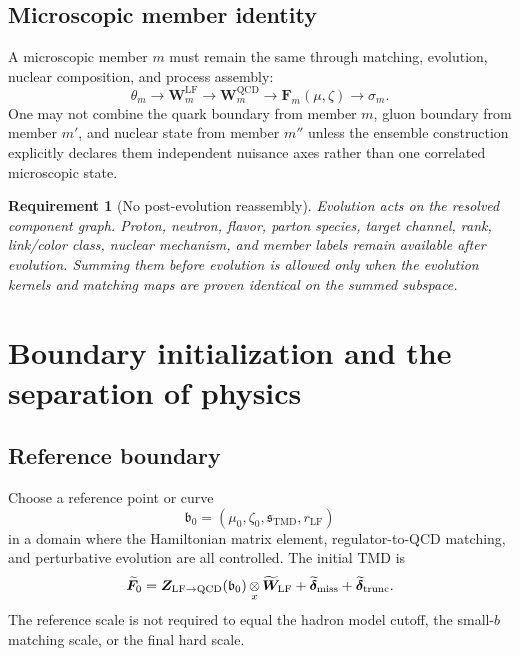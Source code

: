 \documentclass[11pt]{article}
\newtheorem{requirement}[definition]{Requirement}
\newcommand{\LF}{\mathrm{LF}}
\newcommand{\TMD}{\mathrm{TMD}}
\newcommand{\QCD}{\mathrm{QCD}}
\newcommand{\otimesx}{\mathop{\otimes}_{x}}
\begin{document}
\subsection{Microscopic member identity}

A microscopic member \(m\) must remain the same through matching, evolution,
nuclear composition, and process assembly:
\begin{equation}
 \theta_m
 \longrightarrow
 \bm W_m^{\LF}
 \longrightarrow
 \bm W_m^{\QCD}
 \longrightarrow
 \bm F_m(\mu,\zeta)
 \longrightarrow
 \sigma_m.
 \label{eq:member-identity-chain}
\end{equation}
One may not combine the quark boundary from member \(m\), gluon boundary from
member \(m'\), and nuclear state from member \(m''\) unless the ensemble
construction explicitly declares them independent nuisance axes rather than
one correlated microscopic state.

\begin{requirement}[No post-evolution reassembly]
Evolution acts on the resolved component graph.  Proton, neutron, flavor,
parton species, target channel, rank, link/color class, nuclear mechanism,
and member labels remain available after evolution.  Summing them before
evolution is allowed only when the evolution kernels and matching maps are
proven identical on the summed subspace.
\end{requirement}

\section{Boundary initialization and the separation of physics}
\label{sec:boundary}

\subsection{Reference boundary}

Choose a reference point or curve
\begin{equation}
 \mathfrak b_0=
 \left(\mu_0,\zeta_0,\mathfrak s_{\TMD},r_{\LF}\right)
 \label{eq:boundary-record}
\end{equation}
in a domain where the Hamiltonian matrix element, regulator-to-QCD matching,
and perturbative evolution are all controlled.  The initial TMD is
\begin{equation}
 \widetilde{\bm F}_0
 =
 \bm Z_{\LF\to\QCD}(\mathfrak b_0)
 \otimesx\widetilde{\bm W}_{\LF}
 +\widetilde{\bm\delta}_{\rm miss}
 +\widetilde{\bm\delta}_{\rm trunc}.
 \label{eq:initialized-boundary}
\end{equation}
The reference scale is not required to equal the hadron model cutoff, the
small-\(b\) matching scale, or the final hard scale.
\end{document}
